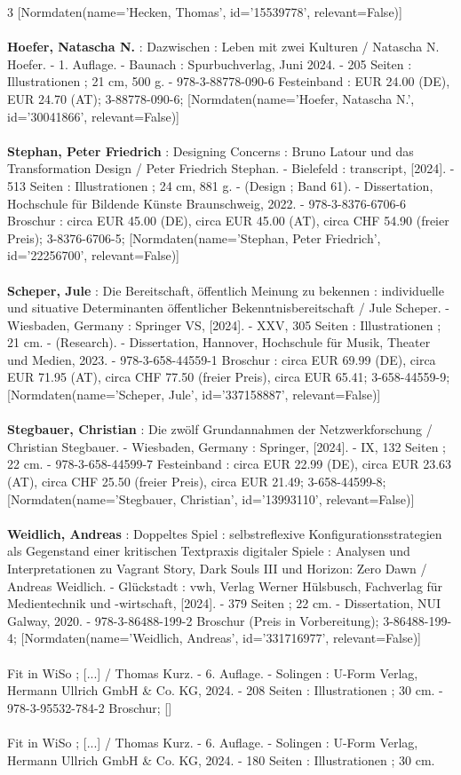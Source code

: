 \documentclass{article}
\begin{document}
\begin{multicols}{3}
[Normdaten(name='Hecken, Thomas', id='15539778', relevant=False)]\\\\\textbf{Hoefer, Natascha N.} : Dazwischen : Leben mit zwei Kulturen / Natascha N. Hoefer. - 1. Auflage. - Baunach : Spurbuchverlag, Juni 2024. - 205 Seiten : Illustrationen ; 21 cm, 500 g. - 978-3-88778-090-6 Festeinband : EUR 24.00 (DE), EUR 24.70 (AT); 3-88778-090-6; [Normdaten(name='Hoefer, Natascha N.', id='30041866', relevant=False)]\\\\\textbf{Stephan, Peter Friedrich} : Designing Concerns : Bruno Latour und das Transformation Design / Peter Friedrich Stephan. - Bielefeld : transcript, [2024]. - 513 Seiten : Illustrationen ; 24 cm, 881 g. - (Design ; Band 61). - Dissertation, Hochschule für Bildende Künste Braunschweig, 2022. - 978-3-8376-6706-6 Broschur : circa EUR 45.00 (DE), circa EUR 45.00 (AT), circa CHF 54.90 (freier Preis); 3-8376-6706-5; [Normdaten(name='Stephan, Peter Friedrich', id='22256700', relevant=False)]\\\\\textbf{Scheper, Jule} : Die Bereitschaft, öffentlich Meinung zu bekennen : individuelle und situative Determinanten öffentlicher Bekenntnisbereitschaft / Jule Scheper. - Wiesbaden, Germany : Springer VS, [2024]. - XXV, 305 Seiten : Illustrationen ; 21 cm. - (Research). - Dissertation, Hannover, Hochschule für Musik, Theater und Medien, 2023. - 978-3-658-44559-1 Broschur : circa EUR 69.99 (DE), circa EUR 71.95 (AT), circa CHF 77.50 (freier Preis), circa EUR 65.41; 3-658-44559-9; [Normdaten(name='Scheper, Jule', id='337158887', relevant=False)]\\\\\textbf{Stegbauer, Christian} : Die zwölf Grundannahmen der Netzwerkforschung / Christian Stegbauer. - Wiesbaden, Germany : Springer, [2024]. - IX, 132 Seiten ; 22 cm. - 978-3-658-44599-7 Festeinband : circa EUR 22.99 (DE), circa EUR 23.63 (AT), circa CHF 25.50 (freier Preis), circa EUR 21.49; 3-658-44599-8; [Normdaten(name='Stegbauer, Christian', id='13993110', relevant=False)]\\\\\textbf{Weidlich, Andreas} : Doppeltes Spiel : selbstreflexive Konfigurationsstrategien als Gegenstand einer kritischen Textpraxis digitaler Spiele : Analysen und Interpretationen zu Vagrant Story, Dark Souls III und Horizon: Zero Dawn / Andreas Weidlich. - Glückstadt : vwh, Verlag Werner Hülsbusch, Fachverlag für Medientechnik und -wirtschaft, [2024]. - 379 Seiten ; 22 cm. - Dissertation, NUI Galway, 2020. - 978-3-86488-199-2 Broschur (Preis in Vorbereitung); 3-86488-199-4; [Normdaten(name='Weidlich, Andreas', id='331716977', relevant=False)]\\\\Fit in WiSo ; [...] / Thomas Kurz. - 6. Auflage. - Solingen : U-Form Verlag, Hermann Ullrich GmbH \& Co. KG, 2024. - 208 Seiten : Illustrationen ; 30 cm. - 978-3-95532-784-2 Broschur; []\\\\Fit in WiSo ; [...] / Thomas Kurz. - 6. Auflage. - Solingen : U-Form Verlag, Hermann Ullrich GmbH \& Co. KG, 2024. - 180 Seiten : Illustrationen ; 30 cm. 
\end{multicols}
\end{document}
